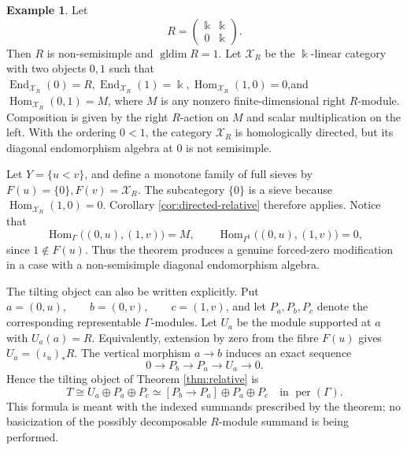 \documentclass[12pt,a4paper,english,reqno]{amsart}
\theoremstyle{plain}
\theoremstyle{definition}
\newtheorem{exm}[theorem]{Example}
\newcommand{\kk}{\Bbbk}
\newcommand{\perf}{\operatorname{per}}
\newcommand{\Hom}{\operatorname{Hom}}
\newcommand{\End}{\operatorname{End}}
\newcommand{\gldim}{\operatorname{gldim}}
\newcommand{\X}{\mathcal X}
\newcommand{\G}{\Gamma}
\newcommand{\Gs}{\Gamma^{\sharp}}
\begin{document}
\begin{exm}
\label{ex:nonsemisimple-diagonal}
Let
\[
 R=
 \begin{pmatrix}
  \kk&\kk\\
  0&\kk
 \end{pmatrix}.
\]
Then $R$ is non-semisimple and $\gldim R=1$.  Let $\X_R$ be the
$\kk$-linear category with two objects $0,1$ such that $\End_{\X_R}(0)=R,\End_{\X_R}(1)=\kk,\Hom_{\X_R}(1,0)=0$,and $\Hom_{\X_R}(0,1)=M$,
where $M$ is any nonzero finite-dimensional right $R$-module.  Composition
is given by the right $R$-action on $M$ and scalar multiplication on the
left.  With the ordering $0<1$, the category $\X_R$ is homologically
directed, but its diagonal endomorphism algebra at $0$ is not semisimple.

Let $Y=\{u<v\}$, and define a monotone family of full sieves by $F(u)=\{0\}, F(v)=\X_R$.
The subcategory $\{0\}$ is a sieve because
$\Hom_{\X_R}(1,0)=0$.  Corollary \ref{cor:directed-relative} therefore
applies.  Notice that
\[
 \Hom_{\G}\bigl((0,u),(1,v)\bigr)=M,
 \qquad
 \Hom_{\Gs}\bigl((0,u),(1,v)\bigr)=0,
\]
since $1\notin F(u)$.  Thus the theorem produces a genuine forced-zero
modification in a case with a non-semisimple diagonal endomorphism algebra.

The tilting object can also be written explicitly.  Put $a=(0,u),\qquad b=(0,v),\qquad c=(1,v)$,
and let $P_a,P_b,P_c$ denote the corresponding representable
$\G$-modules.  Let $U_a$ be the module supported at $a$ with
$U_a(a)=R$.  Equivalently, extension by zero from the fibre $F(u)$ gives
$U_a=(\iota_u)_*R$.  The vertical morphism $a\to b$ induces an exact
sequence
\[
 0\longrightarrow P_b\longrightarrow P_a
   \longrightarrow U_a\longrightarrow0.
\]
Hence the tilting object of Theorem \ref{thm:relative} is
\[
 T\cong U_a\oplus P_a\oplus P_c
 \simeq [P_b\longrightarrow P_a]\oplus P_a\oplus P_c
 \quad\text{in }\perf(\G).
\]
This formula is meant with the indexed summands prescribed by the theorem;
no basicization of the possibly decomposable $R$-module summand is being
performed.
\end{exm}
\end{document}
